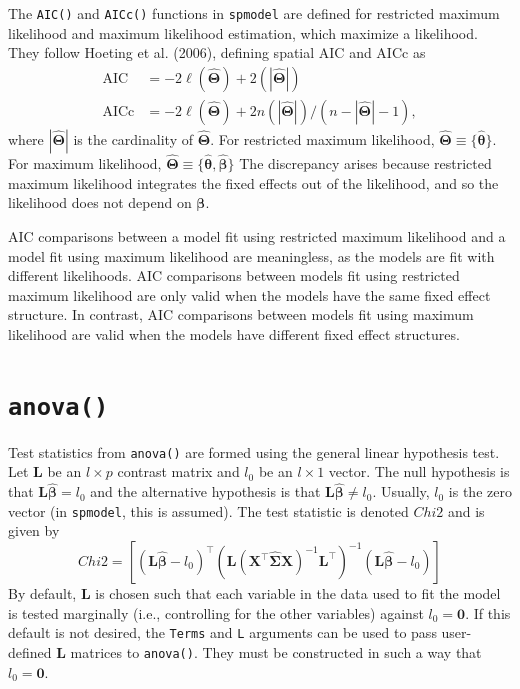 \documentclass{article}
\begin{document}
The \texttt{AIC()} and \texttt{AICc()} functions in \texttt{spmodel} are
defined for restricted maximum likelihood and maximum likelihood
estimation, which maximize a likelihood. They follow Hoeting et al.
(2006), defining spatial AIC and AICc as
\begin{equation*}\label{eq:sp_aic}
  \begin{split}
    \text{AIC} & = -2\ell(\hat{\boldsymbol{\Theta}}) + 2(|\hat{\boldsymbol{\Theta}}|) \\
    \text{AICc} & = -2\ell(\hat{\boldsymbol{\Theta}}) + 2n(|\hat{\boldsymbol{\Theta}}|) / (n - |\hat{\boldsymbol{\Theta}}| - 1),
  \end{split}
\end{equation*} where \(|\hat{\boldsymbol{\Theta}}|\) is the cardinality
of \(\hat{\boldsymbol{\Theta}}\). For restricted maximum likelihood,
\(\hat{\boldsymbol{\Theta}} \equiv \{\hat{\boldsymbol{\theta}}\}\). For
maximum likelihood,
\(\hat{\boldsymbol{\Theta}} \equiv \{\hat{\boldsymbol{\theta}}, \hat{\boldsymbol{\beta}}\}\)
The discrepancy arises because restricted maximum likelihood integrates
the fixed effects out of the likelihood, and so the likelihood does not
depend on \(\boldsymbol{\beta}\).

AIC comparisons between a model fit using restricted maximum likelihood
and a model fit using maximum likelihood are meaningless, as the models
are fit with different likelihoods. AIC comparisons between models fit
using restricted maximum likelihood are only valid when the models have
the same fixed effect structure. In contrast, AIC comparisons between
models fit using maximum likelihood are valid when the models have
different fixed effect structures.

\hypertarget{sec:anova}{%
\section{\texorpdfstring{\texttt{anova()}}{anova()}}\label{sec:anova}}

Test statistics from \texttt{anova()} are formed using the general
linear hypothesis test. Let \(\mathbf{L}\) be an \(l \times p\) contrast
matrix and \(l_0\) be an \(l \times 1\) vector. The null hypothesis is
that \(\mathbf{L} \boldsymbol{\hat{\beta}} = l_0\) and the alternative
hypothesis is that \(\mathbf{L} \boldsymbol{\hat{\beta}} \neq l_0\).
Usually, \(l_0\) is the zero vector (in \texttt{spmodel}, this is
assumed). The test statistic is denoted \(Chi2\) and is given by
\begin{equation*}\label{eq:glht}
  Chi2 = [(\mathbf{L} \boldsymbol{\hat{\beta}} - l_0)^\top(\mathbf{L} (\mathbf{X}^\top \mathbf{\hat{\Sigma}} \mathbf{X})^{-1} \mathbf{L}^\top)^{-1}(\mathbf{L} \boldsymbol{\hat{\beta}} - l_0)]
\end{equation*} By default, \(\mathbf{L}\) is chosen such that each
variable in the data used to fit the model is tested marginally (i.e.,
controlling for the other variables) against \(l_0 = \mathbf{0}\). If
this default is not desired, the \texttt{Terms} and \texttt{L} arguments
can be used to pass user-defined \(\mathbf{L}\) matrices to
\texttt{anova()}. They must be constructed in such a way that
\(l_0 = \mathbf{0}\).
\end{document}

